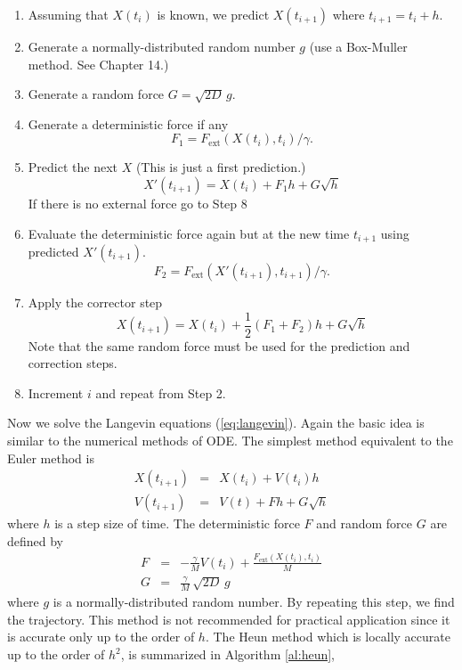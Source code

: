 \begin{myalgobox}
\label{al:heun_od}

\medskip
\begin{minipage}{5in}
\small
\begin{enumerate}
\item Assuming that $X(t_i)$ is known, we predict $X(t_{i+1})$ where $t_{i+1}=t_i+h$.
\item Generate a normally-distributed random number $g$  (use a Box-Muller method. See Chapter 14.)
\item Generate a random force $G = \sqrt{2D}\, g$.
\item Generate a deterministic force if any
\begin{equation}
F_1 = F_\text{ext}(X(t_i),t_i)/\gamma.
\end{equation}
\item Predict the next $X$ (This is just a first prediction.)
\begin{equation}
X'(t_{i+1}) = X(t_i) + F_1 h + G \sqrt{h}
\end{equation}
If there is no external force go to Step 8
\item Evaluate the deterministic force again but at the new time $t_{i+1}$ using predicted $X'(t_{i+1})$.
\begin{equation}
F_2 = F_\text{ext}(X'(t_{i+1}),t_{i+1})/\gamma.
\end{equation}
\item Apply the corrector step
\begin{equation}
X(t_{i+1}) = X(t_i) +\frac{1}{2}(F_1 + F_2) h + G \sqrt{h}
\end{equation}
Note that the same random force must be used for the prediction and correction steps.
\item Increment $i$ and repeat from Step 2.
\end{enumerate}
\end{minipage}
\end{myalgobox}

Now we solve the Langevin equations (\ref{eq:langevin}).  Again the basic idea is similar to the numerical methods of ODE. The simplest method equivalent to the Euler method is
\begin{eqnarray}
X(t_{i+1}) &=& X(t_i) + V(t_i) h \\
V(t_{i+1}) &=& V(t) + F h + G \sqrt{h}
\end{eqnarray}
where $h$ is a step size of time.  The deterministic force $F$ and random force $G$ are defined by
\begin{eqnarray}
F &=&  - \frac{\gamma}{M} V(t_i) + \frac{F_\text{ext}(X(t_i),t_i)}{M}\\
G &=& \frac{\gamma}{M}\, \sqrt{2D}\, g
\end{eqnarray}
where $g$ is a normally-distributed random number.  By repeating this step, we find the trajectory.  This method is not recommended for practical application since it is accurate only up to the order of $h$. The Heun method which is locally accurate up to the order of $h^2$, is summarized in Algorithm \ref{al:heun},    

